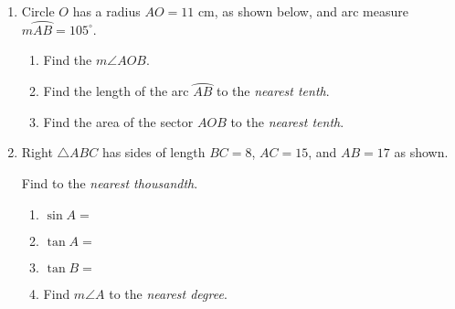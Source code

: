 \documentclass[12pt, twoside]{article}
\begin{document}
\begin{enumerate}
  \item Circle $O$ has a radius $AO=11$ cm, as shown below, and arc measure $m \wideparen{AB}=105^\circ$.
     \begin{multicols}{2}
     \columnbreak
       \begin{enumerate}
         \item Find the $m \angle AOB$. \vspace{1cm}
         \item Find the length of the arc $\wideparen{AB}$ to the \emph{nearest tenth}. \vspace{3cm}
         \item Find the area of the sector $AOB$ to the \emph{nearest tenth}. %
       \end{enumerate}
     \end{multicols}


\newpage
\raggedcolumns
  \item Right $\triangle ABC$ has sides of length $BC=8$, $AC=15$, and $AB=17$ as shown. %
  \begin{multicols}{2}
            Find to the \emph{nearest thousandth}.
        \begin{enumerate}
          \item $\sin A =$ \vspace{1cm}
          \item $\tan A =$ \vspace{1cm}
          \item $\tan B =$ \vspace{1cm}
          \item Find $m\angle A$ to the \emph{nearest degree}. \vspace{1cm}
      \end{enumerate}
    \end{multicols} \vspace{1cm}


\end{enumerate}
\end{document}
